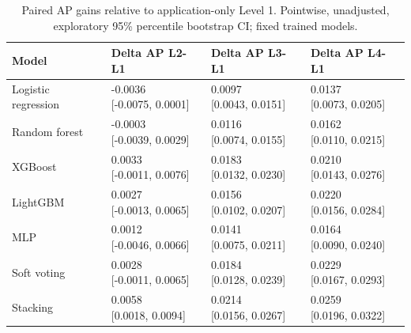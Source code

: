 \begin{table}[htbp]
\centering
\small
\caption{Paired AP gains relative to application-only Level 1. Pointwise, unadjusted, exploratory 95\% percentile bootstrap CI; fixed trained models.}
\label{tab:rq2-baseline-gains}
\begin{tabular}{llll}
\toprule
Model & Delta AP L2-L1 & Delta AP L3-L1 & Delta AP L4-L1 \\
\midrule
Logistic regression & \shortstack{{-0.0036} \\ {[-0.0075, 0.0001]}} & \shortstack{{0.0097} \\ {[0.0043, 0.0151]}} & \shortstack{{0.0137} \\ {[0.0073, 0.0205]}} \\
Random forest & \shortstack{{-0.0003} \\ {[-0.0039, 0.0029]}} & \shortstack{{0.0116} \\ {[0.0074, 0.0155]}} & \shortstack{{0.0162} \\ {[0.0110, 0.0215]}} \\
XGBoost & \shortstack{{0.0033} \\ {[-0.0011, 0.0076]}} & \shortstack{{0.0183} \\ {[0.0132, 0.0230]}} & \shortstack{{0.0210} \\ {[0.0143, 0.0276]}} \\
LightGBM & \shortstack{{0.0027} \\ {[-0.0013, 0.0065]}} & \shortstack{{0.0156} \\ {[0.0102, 0.0207]}} & \shortstack{{0.0220} \\ {[0.0156, 0.0284]}} \\
MLP & \shortstack{{0.0012} \\ {[-0.0046, 0.0066]}} & \shortstack{{0.0141} \\ {[0.0075, 0.0211]}} & \shortstack{{0.0164} \\ {[0.0090, 0.0240]}} \\
Soft voting & \shortstack{{0.0028} \\ {[-0.0011, 0.0065]}} & \shortstack{{0.0184} \\ {[0.0128, 0.0239]}} & \shortstack{{0.0229} \\ {[0.0167, 0.0293]}} \\
Stacking & \shortstack{{0.0058} \\ {[0.0018, 0.0094]}} & \shortstack{{0.0214} \\ {[0.0156, 0.0267]}} & \shortstack{{0.0259} \\ {[0.0196, 0.0322]}} \\
\bottomrule
\end{tabular}
\end{table}
